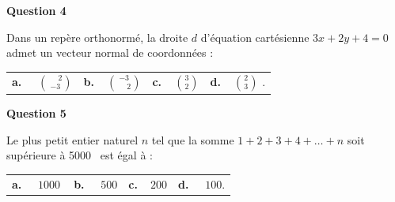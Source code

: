 \documentclass[10pt]{article}
\providecommand{\np}[2][]{{#2~#1}}
\begin{document}
\medskip
\textbf{Question 4}
\medskip 

Dans un repère orthonormé, la droite $d$ d'équation cartésienne
$3 x + 2 y + 4 = 0$ admet un vecteur normal de coordonnées :

\medskip 
\begin{tabularx}{\linewidth}{*{4}{X}}
\textbf{a.~~} $\binom{\phantom{-}2}{-3}$ &\textbf{b.~~}$\binom{-3}{\phantom{-}2}$&\textbf{c.~~}$\binom{3}{2}$& \textbf{d.~~}$\binom{2}{3}$ .
\end{tabularx}

\medskip
\textbf{Question 5}
\medskip 

Le plus petit entier naturel $n$ tel que la somme $1 + 2 + 3 + 4 + \dots + n$ soit
supérieure à \np{5000} est égal à :

\medskip 

\begin{tabularx}{\linewidth}{*{4}{X}}
\textbf{a.~~} $\np{1000} $ &\textbf{b.~~} $ 500 $&\textbf{c.~~}$ 200$& \textbf{d.~~} $100  $.
\end{tabularx}

\vspace{0,5cm}
\end{document}
